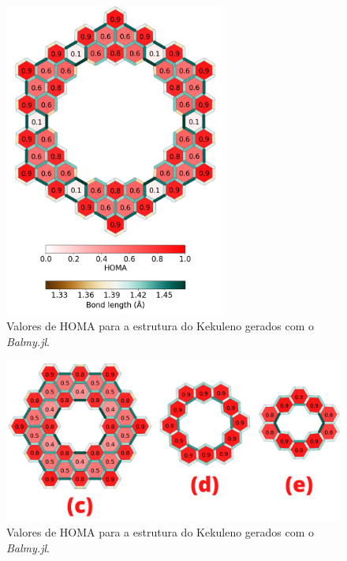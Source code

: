 \begin{figure}[htb]
\caption{\label{fig:HOMA} Valores de HOMA para a estrutura do Kekuleno gerados com o \textit{Balmy.jl}.}
	\begin{center}
		\includegraphics[width=0.65\textwidth]{images/geom.png}
	\end{center}
\end{figure}

\begin{figure}[htb]
\caption{\label{fig:HOMA2} Valores de HOMA para a estrutura do Kekuleno gerados com o \textit{Balmy.jl}.}
	\begin{center}
		\includegraphics[width=1.0\textwidth]{images/fig2(6).png}
	\end{center}
\end{figure}

